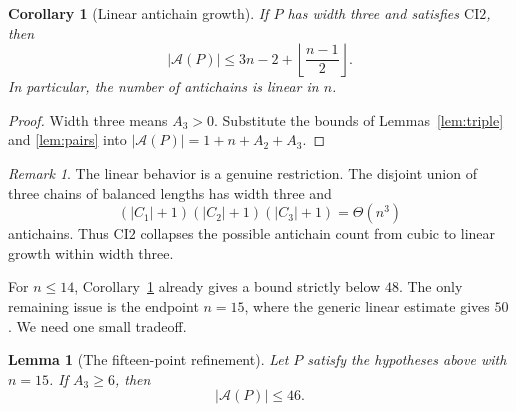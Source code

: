 \documentclass[11pt]{article}
\numberwithin{equation}{section}
\newtheorem{lemma}[theorem]{Lemma}
\newtheorem{corollary}[theorem]{Corollary}
\theoremstyle{definition}
\theoremstyle{remark}
\newtheorem{remark}[theorem]{Remark}
\newcommand{\A}{\mathcal A}
\begin{document}
\begin{corollary}[Linear antichain growth]\label{cor:linear-growth}
If $P$ has width three and satisfies $\mathrm{CI2}$, then
\begin{equation}\label{eq:linear-bound}
|\A(P)|
        \le
        3n-2+\left\lfloor\frac{n-1}{2}\right\rfloor.
\end{equation}
In particular, the number of antichains is linear in $n$.
\end{corollary}

\begin{proof}
Width three means $A_3>0$.  Substitute the bounds of
Lemmas~\ref{lem:triple} and \ref{lem:pairs} into
$|\A(P)|=1+n+A_2+A_3$.
\end{proof}

\begin{remark}
The linear behavior is a genuine restriction.  The disjoint union of three
chains of balanced lengths has width three and
\[
        (|C_1|+1)(|C_2|+1)(|C_3|+1)=\Theta(n^3)
\]
antichains.  Thus $\mathrm{CI2}$ collapses the possible antichain count from
cubic to linear growth within width three.
\end{remark}

For $n\le14$, Corollary~\ref{cor:linear-growth} already gives a bound
strictly below $48$.  The only remaining issue is the endpoint $n=15$,
where the generic linear estimate gives $50$.  We need one small tradeoff.

\begin{lemma}[The fifteen-point refinement]\label{lem:n15}
Let $P$ satisfy the hypotheses above with $n=15$.  If $A_3\ge6$, then
\[
        |\A(P)|\le46.
\]
\end{lemma}
\end{document}

